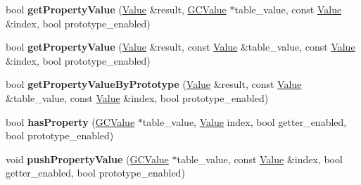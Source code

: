 \begin{DoxyCompactItemize}
\item 
bool {\bfseries get\+Property\+Value} (\hyperlink{struct_object_script_1_1_o_s_1_1_core_1_1_value}{Value} \&result, \hyperlink{struct_object_script_1_1_o_s_1_1_core_1_1_g_c_value}{G\+C\+Value} $\ast$table\+\_\+value, const \hyperlink{struct_object_script_1_1_o_s_1_1_core_1_1_value}{Value} \&index, bool prototype\+\_\+enabled)\hypertarget{class_object_script_1_1_o_s_1_1_core_a77e316ad54931b30f633c848d7277cc5}{}\label{class_object_script_1_1_o_s_1_1_core_a77e316ad54931b30f633c848d7277cc5}

\item 
bool {\bfseries get\+Property\+Value} (\hyperlink{struct_object_script_1_1_o_s_1_1_core_1_1_value}{Value} \&result, const \hyperlink{struct_object_script_1_1_o_s_1_1_core_1_1_value}{Value} \&table\+\_\+value, const \hyperlink{struct_object_script_1_1_o_s_1_1_core_1_1_value}{Value} \&index, bool prototype\+\_\+enabled)\hypertarget{class_object_script_1_1_o_s_1_1_core_adc59cee9bd9a13922abd956e512a2138}{}\label{class_object_script_1_1_o_s_1_1_core_adc59cee9bd9a13922abd956e512a2138}

\item 
bool {\bfseries get\+Property\+Value\+By\+Prototype} (\hyperlink{struct_object_script_1_1_o_s_1_1_core_1_1_value}{Value} \&result, const \hyperlink{struct_object_script_1_1_o_s_1_1_core_1_1_value}{Value} \&table\+\_\+value, const \hyperlink{struct_object_script_1_1_o_s_1_1_core_1_1_value}{Value} \&index, bool prototype\+\_\+enabled)\hypertarget{class_object_script_1_1_o_s_1_1_core_a71147b8777e514182d432bf89ea2e6a9}{}\label{class_object_script_1_1_o_s_1_1_core_a71147b8777e514182d432bf89ea2e6a9}

\item 
bool {\bfseries has\+Property} (\hyperlink{struct_object_script_1_1_o_s_1_1_core_1_1_g_c_value}{G\+C\+Value} $\ast$table\+\_\+value, \hyperlink{struct_object_script_1_1_o_s_1_1_core_1_1_value}{Value} index, bool getter\+\_\+enabled, bool prototype\+\_\+enabled)\hypertarget{class_object_script_1_1_o_s_1_1_core_aecdfeecbeea8d55ac6914b484f2ed2aa}{}\label{class_object_script_1_1_o_s_1_1_core_aecdfeecbeea8d55ac6914b484f2ed2aa}

\item 
void {\bfseries push\+Property\+Value} (\hyperlink{struct_object_script_1_1_o_s_1_1_core_1_1_g_c_value}{G\+C\+Value} $\ast$table\+\_\+value, const \hyperlink{struct_object_script_1_1_o_s_1_1_core_1_1_value}{Value} \&index, bool getter\+\_\+enabled, bool prototype\+\_\+enabled)\hypertarget{class_object_script_1_1_o_s_1_1_core_a29d14ae6e849cc84feb7dc4789c4da50}{}\label{class_object_script_1_1_o_s_1_1_core_a29d14ae6e849cc84feb7dc4789c4da50}


\end{DoxyCompactItemize}
